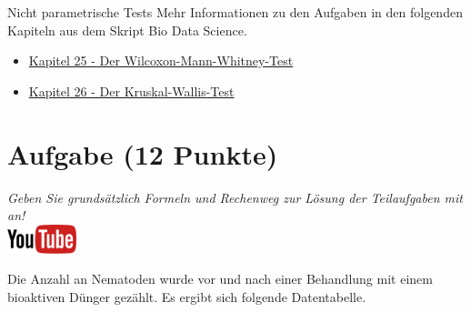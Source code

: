 \documentclass[a4paper, 9pt]{scrartcl}\usepackage[]{graphicx}\usepackage[]{xcolor}
\begin{document}
 
\clearpage
\begin{graybox}{Nicht parametrische Tests}
Mehr Informationen zu den Aufgaben in den folgenden Kapiteln aus dem Skript Bio Data Science.
  \begin{itemize}
  \item \href{https://jkruppa.github.io/stat-tests-utest.html}{Kapitel 25 - Der Wilcoxon-Mann-Whitney-Test}
  \item \href{https://jkruppa.github.io/stat-tests-kruskal.html}{Kapitel 26 - Der Kruskal-Wallis-Test}
  \end{itemize}
\end{graybox}
\clearpage

\section{Aufgabe \hfill (12 Punkte)}

\textit{Geben Sie grunds{\"a}tzlich Formeln und Rechenweg zur L{\"o}sung der
  Teilaufgaben mit an!} \\[1Ex]

\hfill\href{https://youtu.be/ArHA6MZOEOw}{\includegraphics[width =
  2cm]{img/youtube}} %
\hspace{2Ex}


Die Anzahl an Nematoden wurde vor und nach einer Behandlung mit einem
bioaktiven D{\"u}nger gez{\"a}hlt. Es ergibt sich folgende Datentabelle.
\end{document}
